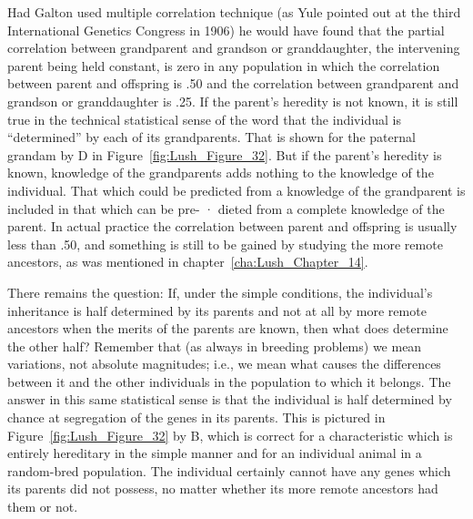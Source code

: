 {Had Galton used multiple correlation technique (as Yule pointed
out at the third International Genetics Congress in 1906) he would
have found that the partial correlation between grandparent and
grandson or granddaughter, the intervening parent being held constant,
is zero in any population in which the correlation between parent
and offspring is .50 and the correlation between grandparent and
grandson or granddaughter is .25. If the parent's heredity is not known,
it is still true in the technical statistical sense of the word that the individual
is ``determined''  by each of its grandparents. That is shown
for the paternal grandam by D in Figure~\ref{fig:Lush_Figure_32}. But if the parent's heredity
is known, knowledge of the grandparents adds nothing to the
knowledge of the individual. That which could be predicted from a
knowledge of the grandparent is included in that which can be pre- ·
dieted from a complete knowledge of the parent. In actual practice the
correlation between parent and offspring is usually less than .50, and
something is still to be gained by studying the more remote ancestors, as
was mentioned in chapter~\ref{cha:Lush_Chapter_14}.

There remains the question: If, under the simple conditions, the
individual's inheritance is half determined by its parents and not at all
by more remote ancestors when the merits of the parents are known,
then what does determine the other half? Remember that (as always in
breeding problems) we mean variations, not absolute magnitudes; i.e.,
we mean what causes the differences between it and the other individuals
in the population to which it belongs. The answer in this same statistical
sense is that the individual is half determined by chance at
segregation of the genes in its parents. This is pictured in
Figure~\ref{fig:Lush_Figure_32} by B, which is correct for a characteristic
which is entirely hereditary in the simple manner and for an individual
animal in a random-bred population. The individual certainly cannot have
any genes which its parents did not possess, no matter whether its more
remote ancestors had them or not.

}
